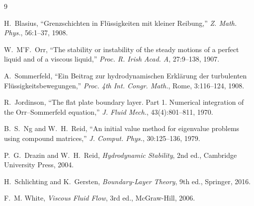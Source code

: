 \documentclass[12pt,a4paper]{article}
\begin{document}
\begin{thebibliography}{9}

H.~Blasius, ``Grenzschichten in Flüssigkeiten mit kleiner Reibung,'' \textit{Z. Math. Phys.}, 56:1--37, 1908.

W.~M'F.~Orr, ``The stability or instability of the steady motions of a perfect liquid and of a viscous liquid,'' \textit{Proc. R. Irish Acad. A}, 27:9--138, 1907.

A.~Sommerfeld, ``Ein Beitrag zur hydrodynamischen Erklärung der turbulenten Flüssigkeitsbewegungen,'' \textit{Proc. 4th Int. Congr. Math.}, Rome, 3:116--124, 1908.

R.~Jordinson, ``The flat plate boundary layer. Part 1. Numerical integration of the Orr--Sommerfeld equation,'' \textit{J. Fluid Mech.}, 43(4):801--811, 1970.

B.~S.~Ng and W.~H.~Reid, ``An initial value method for eigenvalue problems using compound matrices,'' \textit{J. Comput. Phys.}, 30:125--136, 1979.

P.~G.~Drazin and W.~H.~Reid, \textit{Hydrodynamic Stability}, 2nd ed., Cambridge University Press, 2004.

H.~Schlichting and K.~Gersten, \textit{Boundary-Layer Theory}, 9th ed., Springer, 2016.

F.~M. White, \textit{Viscous Fluid Flow}, 3rd ed., McGraw-Hill, 2006.

\end{thebibliography}
\end{document}
